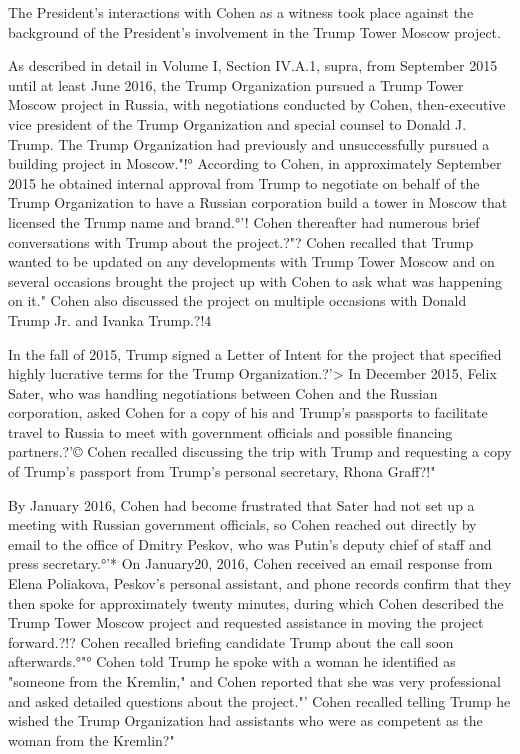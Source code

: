 The President's interactions with Cohen as a witness took place against the background of the President's involvement in the Trump Tower Moscow project.

As described in detail in Volume I, Section IV.A.1, supra, from September 2015 until at least June 2016, the Trump Organization pursued a Trump Tower Moscow project in Russia, with negotiations conducted by Cohen, then-executive vice president of the Trump Organization and special counsel to Donald J. Trump.%
The Trump Organization had previously and unsuccessfully pursued a building project in Moscow."!°
According to Cohen, in approximately September 2015 he obtained internal approval from Trump to negotiate on behalf of the Trump Organization to have a Russian corporation build a tower in Moscow that licensed the Trump name and brand.°'!
Cohen thereafter had numerous brief conversations with Trump about the project.?"?
Cohen recalled that Trump wanted to be updated on any developments with Trump Tower Moscow and on several occasions brought the project up with Cohen to ask what was happening on it."
Cohen also discussed the project on multiple occasions with Donald Trump Jr. and Ivanka Trump.?!4

In the fall of 2015, Trump signed a Letter of Intent for the project that specified highly lucrative terms for the Trump Organization.?'>
In December 2015, Felix Sater, who was handling negotiations between Cohen and the Russian corporation, asked Cohen for a copy of his and Trump's passports to facilitate travel to Russia to meet with government officials and possible financing partners.?'©
Cohen recalled discussing the trip with Trump and requesting a copy of Trump's passport from Trump's personal secretary, Rhona Graff?!"

By January 2016, Cohen had become frustrated that Sater had not set up a meeting with Russian government officials, so Cohen reached out directly by email to the office of Dmitry Peskov, who was Putin's deputy chief of staff and press secretary.°'*
On January20, 2016, Cohen received an email response from Elena Poliakova, Peskov's personal assistant, and phone records confirm that they then spoke for approximately twenty minutes, during which Cohen described the Trump Tower Moscow project and requested assistance in moving the project forward.?!?
Cohen recalled briefing candidate Trump about the call soon afterwards.°"°
Cohen told Trump he spoke with a woman he identified as "someone from the Kremlin," and Cohen reported that she was very professional and asked detailed questions about the project."'
Cohen recalled telling Trump he wished the Trump Organization had assistants who were as competent as the woman from the Kremlin?"

